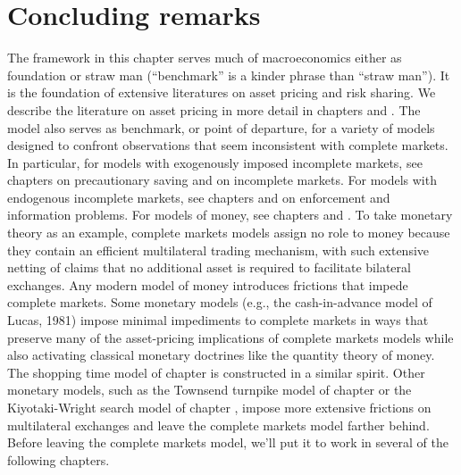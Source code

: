 \section{Concluding remarks}
  The  framework in this chapter serves much of  macroeconomics
either
as foundation or straw man (``benchmark'' is a kinder phrase than
``straw man'').
   It is the foundation of
extensive literatures on asset pricing and risk sharing.
We describe the literature on asset pricing in more
detail in chapters  and .
The model also serves as benchmark, or point of departure,
for a variety of models designed to confront observations
that seem inconsistent with complete markets. In particular,
for models   with exogenously imposed   incomplete markets,
see chapters  on precautionary saving and
 on  incomplete markets. For
models with endogenous incomplete markets,
see chapters  and  on
enforcement and information problems. For
models of money, see
chapters  and .
 To take monetary theory as an example, complete
markets models assign no role to  money because they
contain an efficient multilateral trading mechanism, with such
extensive  netting of claims that no additional asset is
required to facilitate bilateral exchanges.   Any modern model of
money introduces frictions that impede complete markets.     Some
monetary models (e.g., the cash-in-advance model of Lucas, 1981)
impose minimal impediments to complete markets in ways that  preserve many
of the asset-pricing implications of complete markets models while
also activating classical monetary doctrines like the quantity
theory of money. The shopping time model of chapter
 is constructed in a similar
spirit.  Other monetary  models, such as the Townsend turnpike
model of chapter  or the Kiyotaki-Wright search
model of chapter , impose more  extensive frictions
on multilateral exchanges and leave the complete markets model
farther behind.
  Before leaving the complete markets model, we'll put it
to work in several of the following chapters.
   

